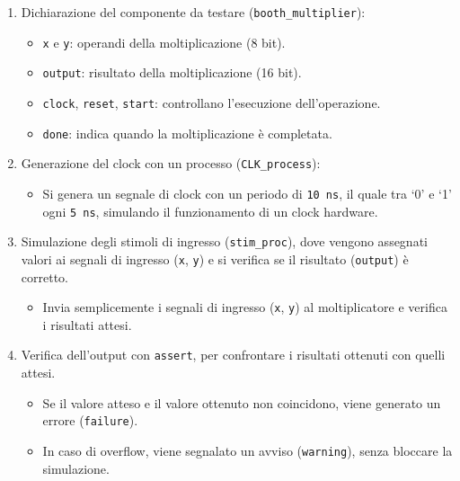 \begin{enumerate}
    \item Dichiarazione del componente da testare (\texttt{booth\_multiplier}):
    \begin{itemize}
        \item \texttt{x} e \texttt{y}: operandi della moltiplicazione (8 bit).
        \item \texttt{output}: risultato della moltiplicazione (16 bit).
        \item \texttt{clock}, \texttt{reset}, \texttt{start}: controllano l'esecuzione dell'operazione.
        \item \texttt{done}: indica quando la moltiplicazione è completata.
    \end{itemize}
    \item Generazione del clock con un processo (\texttt{CLK\_process}):
    \begin{itemize}
        \item Si genera un segnale di clock con un periodo di \texttt{10 ns}, il quale tra `0' e `1' ogni \texttt{5 ns}, simulando il funzionamento di un clock hardware.
    \end{itemize}
    \item Simulazione degli stimoli di ingresso (\texttt{stim\_proc}), dove vengono assegnati valori ai segnali di ingresso (\texttt{x}, \texttt{y}) e si verifica se il risultato (\texttt{output}) è corretto.
    \begin{itemize}
        \item Invia semplicemente i segnali di ingresso (\texttt{x}, \texttt{y}) al moltiplicatore e verifica i risultati attesi.
    \end{itemize}
    \item Verifica dell'output con \texttt{assert}, per confrontare i risultati ottenuti con quelli attesi.
    \begin{itemize}
        \item Se il valore atteso e il valore ottenuto non coincidono, viene generato un errore (\texttt{failure}).
        \item In caso di overflow, viene segnalato un avviso (\texttt{warning}), senza bloccare la simulazione.
    \end{itemize}
\end{enumerate}

